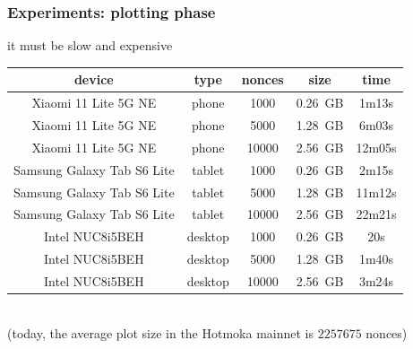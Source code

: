 \documentclass[11pt]{beamer}  %
\begin{document}
\begin{frame}\frametitle{Experiments: plotting phase}

  \begin{center}
    \alert{it must be slow and expensive}
  \end{center}

  \medskip

  \begin{center}
    \begin{tabular}{|c|c||c|c|c|}
      \hline
      \textbf{device} & \textbf{type} & \textbf{nonces} & \textbf{size} & \textbf{time} \\\hline\hline
      Xiaomi 11 Lite 5G NE & phone & 1000 & 0.26~GB & 1m13s \\\hline
      Xiaomi 11 Lite 5G NE & phone & 5000 & 1.28~GB & 6m03s \\\hline
      Xiaomi 11 Lite 5G NE & phone & 10000 & 2.56~GB & 12m05s \\\hline\hline
      Samsung Galaxy Tab S6 Lite & tablet & 1000 & 0.26~GB & 2m15s \\\hline
      Samsung Galaxy Tab S6 Lite & tablet & 5000 & 1.28~GB & 11m12s \\\hline
      Samsung Galaxy Tab S6 Lite & tablet & 10000 & 2.56~GB & 22m21s \\\hline\hline
      Intel NUC8i5BEH & desktop & 1000 & 0.26~GB & 20s \\\hline
      Intel NUC8i5BEH & desktop & 5000 & 1.28~GB & 1m40s \\\hline
      Intel NUC8i5BEH & desktop & 10000 & 2.56~GB & 3m24s \\\hline
    \end{tabular}
    \vspace*{1ex}\\
    (today, the average plot size in the Hotmoka mainnet is $2257675$ nonces)
  \end{center}

\end{frame}
\end{document}
